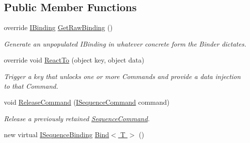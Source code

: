 \subsection*{Public Member Functions}
\begin{DoxyCompactItemize}
\item 
\hypertarget{classstrange_1_1extensions_1_1sequencer_1_1impl_1_1_sequencer_aca52e58b596ec7ab2e3d6fe7169c8882}{override \hyperlink{interfacestrange_1_1framework_1_1api_1_1_i_binding}{I\-Binding} \hyperlink{classstrange_1_1extensions_1_1sequencer_1_1impl_1_1_sequencer_aca52e58b596ec7ab2e3d6fe7169c8882}{Get\-Raw\-Binding} ()}\label{classstrange_1_1extensions_1_1sequencer_1_1impl_1_1_sequencer_aca52e58b596ec7ab2e3d6fe7169c8882}

\begin{DoxyCompactList}\small\item\em Generate an unpopulated I\-Binding in whatever concrete form the Binder dictates. \end{DoxyCompactList}\item 
\hypertarget{classstrange_1_1extensions_1_1sequencer_1_1impl_1_1_sequencer_a8aae14bdce3753a0e4b9e890654a6efd}{override void \hyperlink{classstrange_1_1extensions_1_1sequencer_1_1impl_1_1_sequencer_a8aae14bdce3753a0e4b9e890654a6efd}{React\-To} (object key, object data)}\label{classstrange_1_1extensions_1_1sequencer_1_1impl_1_1_sequencer_a8aae14bdce3753a0e4b9e890654a6efd}

\begin{DoxyCompactList}\small\item\em Trigger a key that unlocks one or more Commands and provide a data injection to that Command. \end{DoxyCompactList}\item 
void \hyperlink{classstrange_1_1extensions_1_1sequencer_1_1impl_1_1_sequencer_a3bd35c4eb952086f159831612b13ce74}{Release\-Command} (\hyperlink{interfacestrange_1_1extensions_1_1sequencer_1_1api_1_1_i_sequence_command}{I\-Sequence\-Command} command)
\begin{DoxyCompactList}\small\item\em Release a previously retained \hyperlink{classstrange_1_1extensions_1_1sequencer_1_1impl_1_1_sequence_command}{Sequence\-Command}. \end{DoxyCompactList}\item 
\hypertarget{classstrange_1_1extensions_1_1sequencer_1_1impl_1_1_sequencer_a735c7cd8e72cc5700e298b0899d4d3b6}{new virtual \hyperlink{interfacestrange_1_1extensions_1_1sequencer_1_1api_1_1_i_sequence_binding}{I\-Sequence\-Binding} \hyperlink{classstrange_1_1extensions_1_1sequencer_1_1impl_1_1_sequencer_a735c7cd8e72cc5700e298b0899d4d3b6}{Bind$<$ T $>$} ()}\label{classstrange_1_1extensions_1_1sequencer_1_1impl_1_1_sequencer_a735c7cd8e72cc5700e298b0899d4d3b6}


\end{DoxyCompactItemize}
